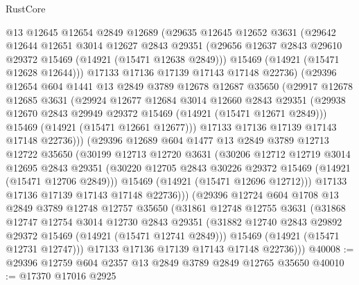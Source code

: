 \begin{lexlean}{RustCore}
\begin{coremodule}
          @13
          @12645
          @12654
          @2849
          @12689
          (@29635
            @12645
            @12652
            @3631
            (@29642
              @12644
              @12651
              @3014
              @12627
              @2843
              @29351
              (@29656 @12637 @2843 @29610 @29372 @15469 (@14921 (@15471 @12638 @2849)))
              @15469
              (@14921 (@15471 @12628 @12644)))
            @17133
            @17136
            @17139
            @17143
            @17148
            @22736)
          (@29396
            @12654
            @604
            @1441
            @13
            @2849
            @3789
            @12678
            @12687
            @35650
            (@29917
              @12678
              @12685
              @3631
              (@29924
                @12677
                @12684
                @3014
                @12660
                @2843
                @29351
                (@29938 @12670 @2843 @29949 @29372 @15469 (@14921 (@15471 @12671 @2849)))
                @15469
                (@14921 (@15471 @12661 @12677)))
              @17133
              @17136
              @17139
              @17143
              @17148
              @22736)))
        (@29396
          @12689
          @604
          @1477
          @13
          @2849
          @3789
          @12713
          @12722
          @35650
          (@30199
            @12713
            @12720
            @3631
            (@30206
              @12712
              @12719
              @3014
              @12695
              @2843
              @29351
              (@30220 @12705 @2843 @30226 @29372 @15469 (@14921 (@15471 @12706 @2849)))
              @15469
              (@14921 (@15471 @12696 @12712)))
            @17133
            @17136
            @17139
            @17143
            @17148
            @22736)))
      (@29396
        @12724
        @604
        @1708
        @13
        @2849
        @3789
        @12748
        @12757
        @35650
        (@31861
          @12748
          @12755
          @3631
          (@31868
            @12747
            @12754
            @3014
            @12730
            @2843
            @29351
            (@31882 @12740 @2843 @29892 @29372 @15469 (@14921 (@15471 @12741 @2849)))
            @15469
            (@14921 (@15471 @12731 @12747)))
          @17133
          @17136
          @17139
          @17143
          @17148
          @22736)))
@40008 := @29396 @12759 @604 @2357 @13 @2849 @3789 @2849 @12765 @35650
@40010 := @17370 @17016 @2925

\end{coremodule}
\end{lexlean}
